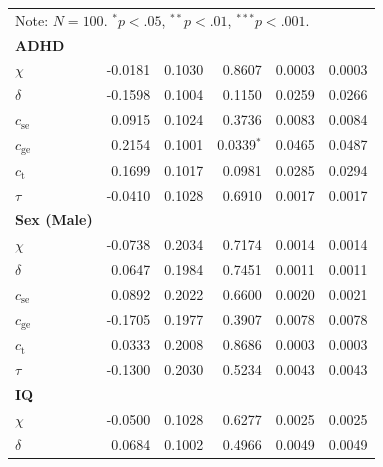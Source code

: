\begin{longtable}{l r r r r r}
        \bottomrule
       \multicolumn{6}{l}{\footnotesize \rule{0pt}{3ex}Note: $N=100$. $^* p<.05$, $^{**} p<.01$, $^{***} p<.001$.} \\
        \endlastfoot
        \textbf{ADHD} & & & & & \\
        \hspace{4mm} $\chi$ & -0.0181 & 0.1030 & 0.8607 & 0.0003 & 0.0003 \\
        \hspace{4mm} $\delta$ & -0.1598 & 0.1004 & 0.1150 & 0.0259 & 0.0266 \\
        \hspace{4mm} $c_{\text{se}}$ & 0.0915 & 0.1024 & 0.3736 & 0.0083 & 0.0084 \\
        \hspace{4mm} $c_{\text{ge}}$ & 0.2154 & 0.1001 & 0.0339$^{*}$ & 0.0465 & 0.0487 \\
        \hspace{4mm} $c_{\text{t}}$ & 0.1699 & 0.1017 & 0.0981 & 0.0285 & 0.0294 \\
        \hspace{4mm} $\tau$ & -0.0410 & 0.1028 & 0.6910 & 0.0017 & 0.0017 \\
        \midrule
        \textbf{Sex (Male)} & & & & & \\
        \hspace{4mm} $\chi$ & -0.0738 & 0.2034 & 0.7174 & 0.0014 & 0.0014 \\
        \hspace{4mm} $\delta$ & 0.0647 & 0.1984 & 0.7451 & 0.0011 & 0.0011 \\
        \hspace{4mm} $c_{\text{se}}$ & 0.0892 & 0.2022 & 0.6600 & 0.0020 & 0.0021 \\
        \hspace{4mm} $c_{\text{ge}}$ & -0.1705 & 0.1977 & 0.3907 & 0.0078 & 0.0078 \\
        \hspace{4mm} $c_{\text{t}}$ & 0.0333 & 0.2008 & 0.8686 & 0.0003 & 0.0003 \\
        \hspace{4mm} $\tau$ & -0.1300 & 0.2030 & 0.5234 & 0.0043 & 0.0043 \\
        \midrule
        \textbf{IQ} & & & & & \\
        \hspace{4mm} $\chi$ & -0.0500 & 0.1028 & 0.6277 & 0.0025 & 0.0025 \\
        \hspace{4mm} $\delta$ & 0.0684 & 0.1002 & 0.4966 & 0.0049 & 0.0049 \\

\end{longtable}
